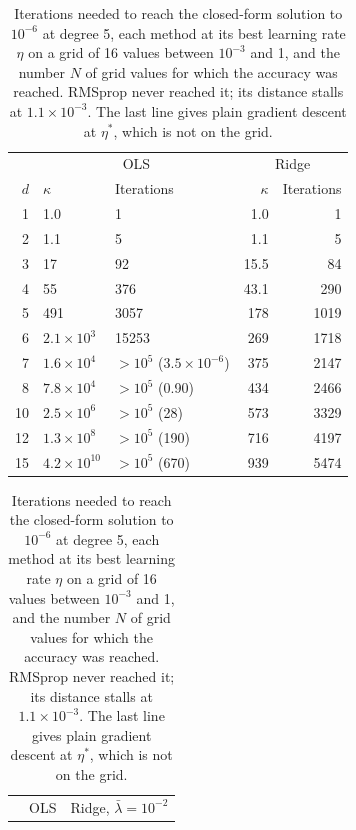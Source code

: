 \documentclass[aps,reprint,amsmath,amssymb,nofootinbib,floatfix]{revtex4-2}
\newcommand{\lb}{\bar\lambda}
\begin{document}
\begin{table}[t]
\begin{minipage}[t]{0.485\textwidth}
\caption{Plain gradient descent at $\eta^*$ for the degrees of Secs.~\ref{sec:res_ols}
and~\ref{sec:res_ridge}: condition number $\kappa$ of the Hessian, iterations needed to reach the
closed form to $10^{-6}$ (at most $10^{5}$), and, where this was not reached, the final distance
(in parentheses). Ridge uses $\lb=10^{-2}$ and converges at every degree.}
\label{tab:gd_degree}
\begin{ruledtabular}
\begin{tabular}{rllrr}
 & \multicolumn{2}{c}{OLS} & \multicolumn{2}{c}{Ridge} \\
$d$ & $\kappa$ & Iterations & $\kappa$ & Iterations \\
\hline
1 & 1.0 & 1 & 1.0 & 1 \\
2 & 1.1 & 5 & 1.1 & 5 \\
3 & 17 & 92 & 15.5 & 84 \\
4 & 55 & 376 & 43.1 & 290 \\
5 & 491 & 3057 & 178 & 1019 \\
6 & $2.1\times10^{3}$ & 15253 & 269 & 1718 \\
7 & $1.6\times10^{4}$ & $>10^5$ ($3.5\times10^{-6}$) & 375 & 2147 \\
8 & $7.8\times10^{4}$ & $>10^5$ (0.90) & 434 & 2466 \\
10 & $2.5\times10^{6}$ & $>10^5$ (28) & 573 & 3329 \\
12 & $1.3\times10^{8}$ & $>10^5$ (190) & 716 & 4197 \\
15 & $4.2\times10^{10}$ & $>10^5$ (670) & 939 & 5474 \\
\end{tabular}
\end{ruledtabular}
\end{minipage}\hfill
\begin{minipage}[t]{0.485\textwidth}
\caption{Iterations needed to reach the closed-form solution to $10^{-6}$ at degree 5, each method
at its best learning rate $\eta$ on a grid of 16 values between $10^{-3}$ and 1, and the number
$N$ of grid values for which the accuracy was reached. RMSprop never reached it; its distance
stalls at $1.1\times10^{-3}$. The last line gives plain gradient descent at $\eta^*$, which is not
on the grid.}
\label{tab:optimisers}
\begin{ruledtabular}
\begin{tabular}{lcrccrc}
 & \multicolumn{3}{c}{OLS} & \multicolumn{3}{c}{Ridge, $\lb=10^{-2}$} \\

\end{tabular}
\end{ruledtabular}
\end{minipage}
\end{table}
\end{document}
